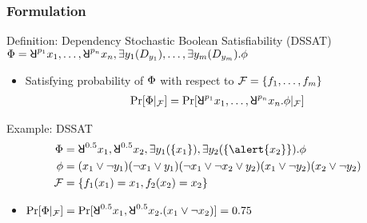 \begin{frame}
  \frametitle{Formulation}
  \begin{block}{Definition: Dependency Stochastic Boolean Satisfiability (DSSAT)}
    $\Qf=\random{p_1} x_1, \ldots, \random{p_n} x_n, \exists y_1(D_{y_1}), \ldots, \exists y_m(D_{y_m}).\pf$
    \begin{itemize}
      \item Satisfying probability of $\Phi$ with respect to $\mathcal{F}=\{f_1,\ldots,f_m\}$
            \begin{align*}
              \spb{\pcf{\Qf}{\skf}}=\Pr[\random{p_1} x_1, \ldots, \random{p_n} x_n.\pf|_{\skf}]
            \end{align*}
    \end{itemize}
  \end{block}
  \pause
  \begin{block}{Example: DSSAT}
    \abovedisplayskip=0pt
    \belowdisplayskip=0pt
    \begin{align*}
      \Qf  & = \random{0.5} x_1,\random{0.5} x_2,\exists y_1(\{x_1\}),\exists y_2(\{\alert{x_2}\}).\pf \\
      \pf  & = (x_1 \lor \lnot y_1)
      (\lnot x_1 \lor y_1)
      (\lnot x_1 \lor \lnot x_2 \lor y_2)
      (x_1 \lor \lnot y_2)
      (x_2 \lor \lnot y_2)                                                                             \\
      \skf & =\{f_1(x_1)=x_1,f_2(x_2)=x_2\}
    \end{align*}
    \begin{itemize}
      \item $\spb{\pcf{\Qf}{\skf}}=\spb{\random{0.5} x_1,\random{0.5} x_2.(x_1\lor\lnot x_2)}=0.75$
    \end{itemize}
  \end{block}
\end{frame}